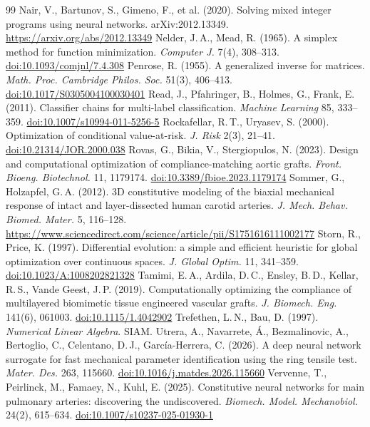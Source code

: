 \begin{thebibliography}{99}
 Nair, V., Bartunov, S., Gimeno, F., et al. (2020). Solving mixed integer programs using neural networks. arXiv:2012.13349. \url{https://arxiv.org/abs/2012.13349}
 Nelder, J.\,A., Mead, R. (1965). A simplex method for function minimization. \emph{Computer J.} 7(4), 308--313. \href{https://doi.org/10.1093/comjnl/7.4.308}{doi:10.1093/comjnl/7.4.308}
 Penrose, R. (1955). A generalized inverse for matrices. \emph{Math. Proc. Cambridge Philos. Soc.} 51(3), 406--413. \href{https://doi.org/10.1017/S0305004100030401}{doi:10.1017/S0305004100030401}
 Read, J., Pfahringer, B., Holmes, G., Frank, E. (2011). Classifier chains for multi-label classification. \emph{Machine Learning} 85, 333--359. \href{https://doi.org/10.1007/s10994-011-5256-5}{doi:10.1007/s10994-011-5256-5}
 Rockafellar, R.\,T., Uryasev, S. (2000). Optimization of conditional value-at-risk. \emph{J. Risk} 2(3), 21--41. \href{https://doi.org/10.21314/JOR.2000.038}{doi:10.21314/JOR.2000.038}
 Rovas, G., Bikia, V., Stergiopulos, N. (2023). Design and computational optimization of compliance-matching aortic grafts. \emph{Front. Bioeng. Biotechnol.} 11, 1179174. \href{https://doi.org/10.3389/fbioe.2023.1179174}{doi:10.3389/fbioe.2023.1179174}
 Sommer, G., Holzapfel, G.\,A. (2012). 3D constitutive modeling of the biaxial mechanical response of intact and layer-dissected human carotid arteries. \emph{J. Mech. Behav. Biomed. Mater.} 5, 116--128. \url{https://www.sciencedirect.com/science/article/pii/S1751616111002177}
 Storn, R., Price, K. (1997). Differential evolution: a simple and efficient heuristic for global optimization over continuous spaces. \emph{J. Global Optim.} 11, 341--359. \href{https://doi.org/10.1023/A:1008202821328}{doi:10.1023/A:1008202821328}
 Tamimi, E.\,A., Ardila, D.\,C., Ensley, B.\,D., Kellar, R.\,S., Vande Geest, J.\,P. (2019). Computationally optimizing the compliance of multilayered biomimetic tissue engineered vascular grafts. \emph{J. Biomech. Eng.} 141(6), 061003. \href{https://doi.org/10.1115/1.4042902}{doi:10.1115/1.4042902}
 Trefethen, L.\,N., Bau, D. (1997). \emph{Numerical Linear Algebra}. SIAM.
 Utrera, A., Navarrete, \'A., Bezmalinovic, A., Bertoglio, C., Celentano, D.\,J., García-Herrera, C. (2026). A deep neural network surrogate for fast mechanical parameter identification using the ring tensile test. \emph{Mater. Des.} 263, 115660. \href{https://doi.org/10.1016/j.matdes.2026.115660}{doi:10.1016/j.matdes.2026.115660}
 Vervenne, T., Peirlinck, M., Famaey, N., Kuhl, E. (2025). Constitutive neural networks for main pulmonary arteries: discovering the undiscovered. \emph{Biomech. Model. Mechanobiol.} 24(2), 615--634. \href{https://doi.org/10.1007/s10237-025-01930-1}{doi:10.1007/s10237-025-01930-1}
\end{thebibliography}

